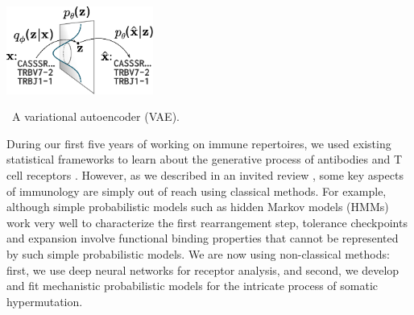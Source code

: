 \documentclass[nobib]{tufte-handout}
\begin{document}
\begin{marginfigure}[0.2in]%
\begin{centering}
    \includegraphics[width=1.9in]{figures/vae.pdf}
\end{centering}
  \caption{\
    A variational autoencoder (VAE).
    }
  \label{FIGvae}
\end{marginfigure}%
During our first five years of working on immune repertoires, we used existing statistical frameworks to learn about the generative process of antibodies and T cell receptors \cite{McCoy2015-qi, Ralph2016-kr, Ralph2016-yl, Ralph2017-ih, DeWitt2018-el, Dhar2018-ne, Zhang2018-gn, Davidsen2018-gn, DeWitt2018-ar, Simonich2019-nn, Feng2019-sj, Dhar2019-qg}.
However, as we described in an invited review \cite{Olson2018-lw}, some key aspects of immunology are simply out of reach using classical methods.
For example, although simple probabilistic models such as hidden Markov models (HMMs) work very well to characterize the first rearrangement step, tolerance checkpoints and expansion involve functional binding properties that cannot be represented by such simple probabilistic models.
We are now using non-classical methods:
first, we use deep neural networks for receptor analysis, and second, we develop and fit mechanistic probabilistic models for the intricate process of somatic hypermutation.

\end{document}
